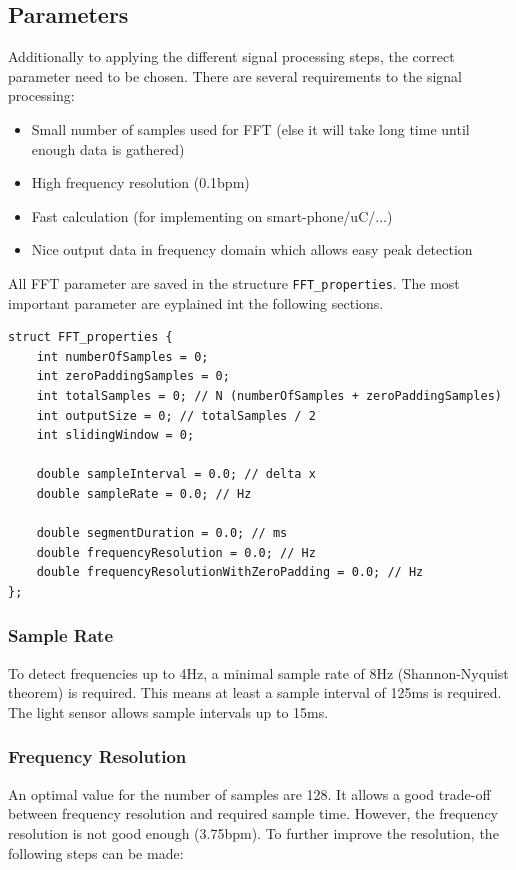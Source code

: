 \documentclass[notitlepage]{scrreprt}
\begin{document}
\subsection{Parameters}
Additionally to applying the different signal processing steps, the correct parameter need to be chosen. There are several requirements to the signal processing:
\begin{itemize}
	\item{Small number of samples used for FFT (else it will take long time until enough data is gathered)}
	\item{High frequency resolution (0.1bpm)}
	\item{Fast calculation (for implementing on smart-phone/uC/...)}
	\item{Nice output data in frequency domain which allows easy peak detection}\\
\end{itemize}

\newpage

All FFT parameter are saved in the structure \lstinline{FFT_properties}. The most important parameter are eyplained int the following sections.

\begin{lstlisting}
struct FFT_properties {
    int numberOfSamples = 0;
    int zeroPaddingSamples = 0;
    int totalSamples = 0; // N (numberOfSamples + zeroPaddingSamples)
    int outputSize = 0; // totalSamples / 2
    int slidingWindow = 0;

    double sampleInterval = 0.0; // delta x
    double sampleRate = 0.0; // Hz

    double segmentDuration = 0.0; // ms
    double frequencyResolution = 0.0; // Hz
    double frequencyResolutionWithZeroPadding = 0.0; // Hz
};
\end{lstlisting}

\subsubsection{Sample Rate}
To detect frequencies up to 4Hz, a minimal sample rate of 8Hz (Shannon-Nyquist theorem) is required.
This means at least a sample interval of 125ms is required. The light sensor allows sample intervals up to 15ms.

\subsubsection{Frequency Resolution}
An optimal value for the number of samples are 128. It allows a good trade-off between frequency resolution and required sample time.
However, the frequency resolution is not good enough (3.75bpm). To further improve the resolution, the following steps can be made:
\end{document}
